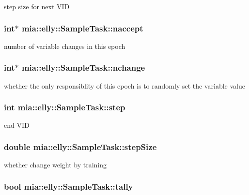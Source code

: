 step size for next V\-I\-D \hypertarget{classmia_1_1elly_1_1_sample_task_af640fef9f121e0d175ea710260b78746}{
\subsubsection[{naccept}]{\setlength{\rightskip}{0pt plus 5cm}int$\ast$ mia\-::elly\-::\-Sample\-Task\-::naccept}}\label{classmia_1_1elly_1_1_sample_task_af640fef9f121e0d175ea710260b78746}
number of variable changes in this epoch \hypertarget{classmia_1_1elly_1_1_sample_task_a5991780307c024d2f458bf264db39e4a}{
\subsubsection[{nchange}]{\setlength{\rightskip}{0pt plus 5cm}int$\ast$ mia\-::elly\-::\-Sample\-Task\-::nchange}}\label{classmia_1_1elly_1_1_sample_task_a5991780307c024d2f458bf264db39e4a}
whether the only responsiblity of this epoch is to randomly set the variable value \hypertarget{classmia_1_1elly_1_1_sample_task_aac20c514247f8c744d7875f75285e620}{
\subsubsection[{step}]{\setlength{\rightskip}{0pt plus 5cm}int mia\-::elly\-::\-Sample\-Task\-::step}}\label{classmia_1_1elly_1_1_sample_task_aac20c514247f8c744d7875f75285e620}
end V\-I\-D \hypertarget{classmia_1_1elly_1_1_sample_task_a030ab30b66c586f7dc0c3dac519c95a1}{
\subsubsection[{step\-Size}]{\setlength{\rightskip}{0pt plus 5cm}double mia\-::elly\-::\-Sample\-Task\-::step\-Size}}\label{classmia_1_1elly_1_1_sample_task_a030ab30b66c586f7dc0c3dac519c95a1}
whether change weight by training \hypertarget{classmia_1_1elly_1_1_sample_task_a78c30f72cc6f55e71b22c617f4792e15}{
\subsubsection[{tally}]{\setlength{\rightskip}{0pt plus 5cm}bool mia\-::elly\-::\-Sample\-Task\-::tally}}\label{classmia_1_1elly_1_1_sample_task_a78c30f72cc6f55e71b22c617f4792e15}
